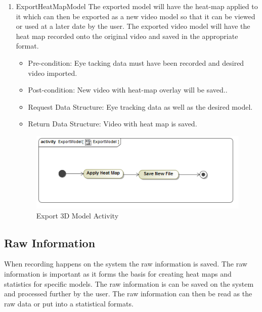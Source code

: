 \begin{enumerate}
			\item{ExportHeatMapModel}
			The exported model will have the heat-map applied to it which can then be exported as a new video model so that it can be viewed or used at a later date by the user. The exported video model will have the heat map recorded onto the original video and saved in the appropriate format.
			\begin{itemize}
				\item Pre-condition: Eye tacking data must have been recorded and desired video imported.
				\item Post-condition: New video with heat-map overlay will be saved..
				\item Request Data Structure: Eye tracking data as well as the desired model.
				\item Return Data Structure: Video with heat map is saved.
			\end{itemize}
		\begin{figure}[!ht]
			\centering
			\includegraphics[scale=0.5,width=15cm,keepaspectratio]{Diagrams/Activity_Diagram__ExportModel__ExportModel.png}
			\caption{Export 3D Model Activity}
		\end{figure}
	
		\end{enumerate}
		
\subsection{Raw Information}
When recording happens on the system the raw information is saved. The raw information is important as it forms the basis for creating heat maps and statistics for specific models. The raw information is can be saved on the system and processed further by the user. The raw information can then be read as the raw data or put into a statistical formats.
\newline

